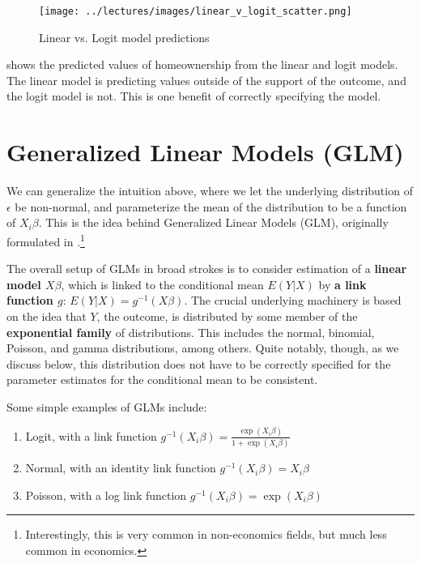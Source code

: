 \documentclass{tufte-handout}
\theoremstyle{break}
\newcommand{\continuation}{??}
\newenvironment{continueexample}[1]
 {\renewcommand{\continuation}{\ref{#1}}\excont[continued]}
 {\endexcont}
\begin{document}
\begin{figure}
    \caption{Linear vs. Logit model predictions}
    \label{fig:linear_v_logit}
    \texttt{[image: ../lectures/images/linear\_v\_logit\_scatter.png]}
    \end{figure}
  
\begin{boxD}
    \begin{continueexample}{example:homeownership}
         shows the predicted values of homeownership from the linear and logit models.  The linear model is predicting values outside of the support of the outcome, and the logit model is not.  This is one benefit of correctly specifying the model. 
    \end{continueexample}
\end{boxD}
  
\section{Generalized Linear Models (GLM)}
We can generalize the intuition above, where we let the underlying distribution of $\epsilon$ be non-normal, and parameterize the mean of the distribution to be a function of $X_{i}\beta$. This is the idea behind Generalized Linear Models (GLM), originally formulated in \citet{nelder1972generalized}.\footnote{Interestingly, this is very common in non-economics fields, but much less common in economics.} 

The overall setup of GLMs in broad strokes is to consider estimation of a \textbf{linear model $X\beta$}, which is linked to the conditional mean $E(Y|X)$ by \textbf{a link function $g$}: $E(Y|X) = g^{-1}(X\beta)$. The crucial underlying machinery is based on the idea that $Y$, the outcome, is distributed by some member of the \textbf{exponential family} of distributions. This includes the normal, binomial, Poisson, and gamma distributions, among others. Quite notably, though, as we discuss below, this distribution does not have to be correctly specified for the parameter estimates for the conditional mean to be consistent.

Some simple examples of GLMs include:
        \begin{enumerate}
        \item Logit, with a link function $g^{-1}(X_{i}\beta) = \frac{\exp(X_{i}\beta)}{1+\exp(X_{i}\beta)}$
        \item Normal, with an identity link function $g^{-1}(X_{i}\beta) = X_{i}\beta$
        \item Poisson, with a log link function $g^{-1}(X_{i}\beta) = \exp(X_{i}\beta)$
        \end{enumerate}
\end{document}
